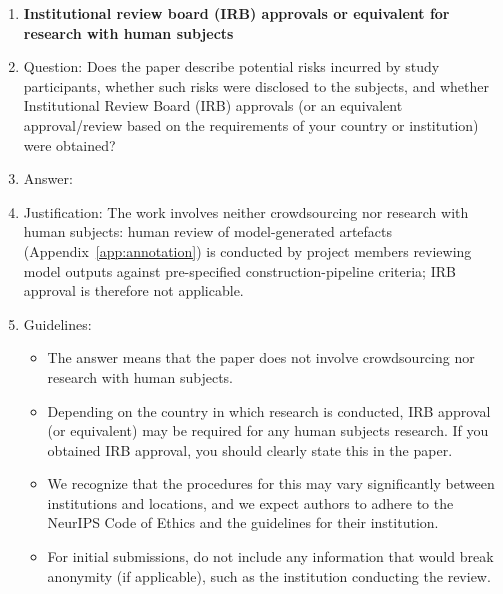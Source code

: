 \documentclass{article}
\begin{document}
\begin{enumerate}
\item {\bf Institutional review board (IRB) approvals or equivalent for research with human subjects}
    \item[] Question: Does the paper describe potential risks incurred by study participants, whether such risks were disclosed to the subjects, and whether Institutional Review Board (IRB) approvals (or an equivalent approval/review based on the requirements of your country or institution) were obtained?
    \item[] Answer: \answerNA{}
    \item[] Justification: The work involves neither crowdsourcing nor research with human subjects: human review of model-generated artefacts (Appendix~\ref{app:annotation}) is conducted by project members reviewing model outputs against pre-specified construction-pipeline criteria; IRB approval is therefore not applicable.
    \item[] Guidelines:
    \begin{itemize}
        \item The answer \answerNA{} means that the paper does not involve crowdsourcing nor research with human subjects.
        \item Depending on the country in which research is conducted, IRB approval (or equivalent) may be required for any human subjects research. If you obtained IRB approval, you should clearly state this in the paper.
        \item We recognize that the procedures for this may vary significantly between institutions and locations, and we expect authors to adhere to the NeurIPS Code of Ethics and the guidelines for their institution.
        \item For initial submissions, do not include any information that would break anonymity (if applicable), such as the institution conducting the review.
    \end{itemize}


\end{enumerate}
\end{document}
